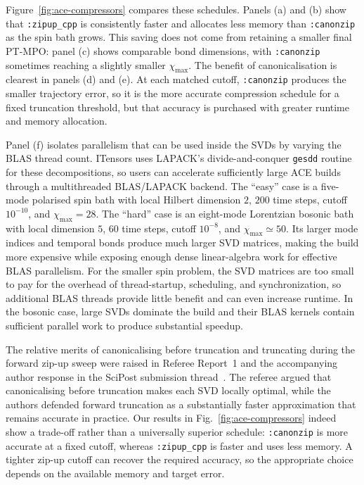 Figure~\ref{fig:ace-compressors} compares these schedules.
Panels (a) and (b) show that \texttt{:zipup\_cpp} is consistently faster and allocates less memory than \texttt{:canonzip} as the spin bath grows.
This saving does not come from retaining a smaller final PT-MPO: panel (c) shows comparable bond dimensions, with \texttt{:canonzip} sometimes reaching a slightly smaller \(\chi_{\max}\).
The benefit of canonicalisation is clearest in panels (d) and (e).
At each matched cutoff, \texttt{:canonzip} produces the smaller trajectory error, so it is the more accurate compression schedule for a fixed truncation threshold, but that accuracy is purchased with greater runtime and memory allocation.

Panel (f) isolates parallelism that can be used inside the SVDs by varying the BLAS thread count.
ITensors uses LAPACK's divide-and-conquer \texttt{gesdd} routine for these decompositions, so users can accelerate sufficiently large ACE builds through a multithreaded BLAS/LAPACK backend.
The ``easy'' case is a five-mode polarised spin bath with local Hilbert dimension \(2\), \(200\) time steps, cutoff \(10^{-10}\), and \(\chi_{\max}=28\).
The ``hard'' case is an eight-mode Lorentzian bosonic bath with local dimension \(5\), \(60\) time steps, cutoff \(10^{-8}\), and \(\chi_{\max}\simeq50\).
Its larger mode indices and temporal bonds produce much larger SVD matrices, making the build more expensive while exposing enough dense linear-algebra work for effective BLAS parallelism.
For the smaller spin problem, the SVD matrices are too small to pay for the overhead of thread-startup, scheduling, and synchronization, so additional BLAS threads provide little benefit and can even increase runtime.
In the bosonic case, large SVDs dominate the build and their BLAS kernels contain sufficient parallel work to produce substantial speedup.

The relative merits of canonicalising before truncation and truncating during the forward zip-up sweep were raised in Referee Report~1 and the accompanying author response in the SciPost submission thread~\cite{SciPostReport9135}.
The referee argued that canonicalising before truncation makes each SVD locally optimal, while the authors defended forward truncation as a substantially faster approximation that remains accurate in practice.
Our results in Fig.~\ref{fig:ace-compressors} indeed show a trade-off rather than a universally superior schedule: \texttt{:canonzip} is more accurate at a fixed cutoff, whereas \texttt{:zipup\_cpp} is faster and uses less memory.
A tighter zip-up cutoff can recover the required accuracy, so the appropriate choice depends on the available memory and target error.


